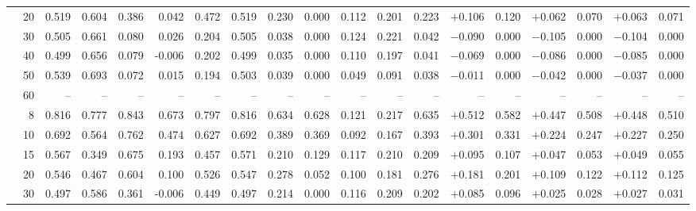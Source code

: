 \documentclass[conference]{IEEEtran}
\theoremstyle{remark}
\begin{document}
\begin{table}[ht]
{\begin{tabular}{p{1.55cm}r rrrr rr rr rr r rr rr rr}
  & 20 & 0.519 & 0.604 & 0.386 & 0.042 & 0.472 & 0.519 & 0.230 & 0.000 & 0.112 & 0.201 & 0.223 & $+$0.106 & 0.120 & $+$0.062 & 0.070 & $+$0.063 & 0.071 \\
  & 30 & 0.505 & 0.661 & 0.080 & 0.026 & 0.204 & 0.505 & 0.038 & 0.000 & 0.124 & 0.221 & 0.042 & $-$0.090 & 0.000 & $-$0.105 & 0.000 & $-$0.104 & 0.000 \\
  & 40 & 0.499 & 0.656 & 0.079 & -0.006 & 0.202 & 0.499 & 0.035 & 0.000 & 0.110 & 0.197 & 0.041 & $-$0.069 & 0.000 & $-$0.086 & 0.000 & $-$0.085 & 0.000 \\
  & 50 & 0.539 & 0.693 & 0.072 & 0.015 & 0.194 & 0.503 & 0.039 & 0.000 & 0.049 & 0.091 & 0.038 & $-$0.011 & 0.000 & $-$0.042 & 0.000 & $-$0.037 & 0.000 \\
  & 60 & -- & -- & -- & -- & -- & -- & -- & -- & -- & -- & -- & -- & -- & -- & -- & -- & -- \\
\midrule
{}
  & 8 & 0.816 & 0.777 & 0.843 & 0.673 & 0.797 & 0.816 & 0.634 & 0.628 & 0.121 & 0.217 & 0.635 & $+$0.512 & 0.582 & $+$0.447 & 0.508 & $+$0.448 & 0.510 \\
  & 10 & 0.692 & 0.564 & 0.762 & 0.474 & 0.627 & 0.692 & 0.389 & 0.369 & 0.092 & 0.167 & 0.393 & $+$0.301 & 0.331 & $+$0.224 & 0.247 & $+$0.227 & 0.250 \\
  & 15 & 0.567 & 0.349 & 0.675 & 0.193 & 0.457 & 0.571 & 0.210 & 0.129 & 0.117 & 0.210 & 0.209 & $+$0.095 & 0.107 & $+$0.047 & 0.053 & $+$0.049 & 0.055 \\
  & 20 & 0.546 & 0.467 & 0.604 & 0.100 & 0.526 & 0.547 & 0.278 & 0.052 & 0.100 & 0.181 & 0.276 & $+$0.181 & 0.201 & $+$0.109 & 0.122 & $+$0.112 & 0.125 \\
  & 30 & 0.497 & 0.586 & 0.361 & -0.006 & 0.449 & 0.497 & 0.214 & 0.000 & 0.116 & 0.209 & 0.202 & $+$0.085 & 0.096 & $+$0.025 & 0.028 & $+$0.027 & 0.031 \\

\end{tabular}}
\end{table}
\end{document}
